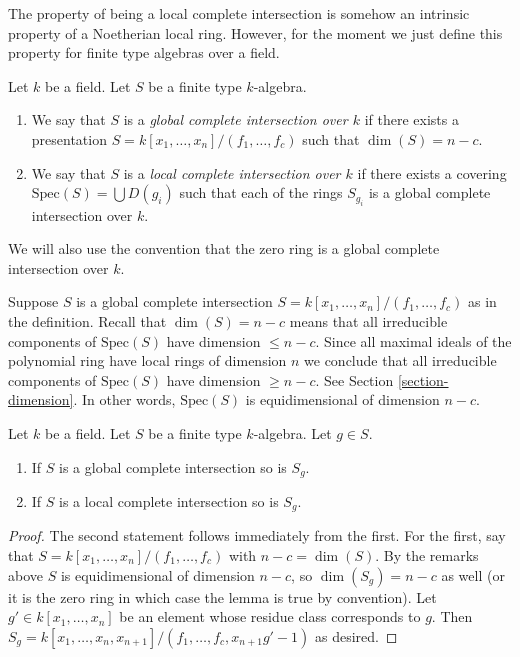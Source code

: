 \noindent
The property of being a local complete intersection is
somehow an intrinsic property of a Noetherian local ring.
However, for the moment we just define this property for
finite type algebras over a field.

\begin{definition}
\label{definition-lci-field}
Let $k$ be a field.
Let $S$ be a finite type $k$-algebra.
\begin{enumerate}
\item We say that $S$ is a {\it global complete intersection over $k$}
if there exists a presentation $S = k[x_1, \ldots, x_n]/(f_1, \ldots, f_c)$
such that $\dim(S) = n - c$.
\item We say that $S$ is a {\it local complete intersection over $k$}
if there exists a covering $\text{Spec}(S) = \bigcup D(g_i)$ such
that each of the rings $S_{g_i}$ is a global complete intersection
over $k$.
\end{enumerate}
We will also use the convention that the zero ring is a global
complete intersection over $k$.
\end{definition}

\noindent
Suppose $S$ is a global complete intersection
$S = k[x_1, \ldots, x_n]/(f_1, \ldots, f_c)$
as in the definition.
Recall that $\dim(S) = n - c$ means that all irreducible
components of $\text{Spec}(S)$ have dimension $\leq n - c$.
Since all maximal ideals of the polynomial ring have local
rings of dimension $n$ we conclude that all irreducible
components of $\text{Spec}(S)$ have dimension $\geq n - c$.
See Section \ref{section-dimension}.
In other words, $\text{Spec}(S)$ is equidimensional
of dimension $n - c$.

\begin{lemma}
\label{lemma-localize-lci}
Let $k$ be a field.
Let $S$ be a finite type $k$-algebra.
Let $g \in S$.
\begin{enumerate}
\item If $S$ is a global complete intersection so is $S_g$.
\item If $S$ is a local complete intersection so is $S_g$.
\end{enumerate}
\end{lemma}

\begin{proof}
The second statement follows immediately from the first.
For the first, say that $S = k[x_1, \ldots, x_n]/(f_1, \ldots, f_c)$
with $n - c = \dim(S)$. By the remarks above $S$ is equidimensional
of dimension $n - c$, so $\dim(S_g) = n - c$ as well (or it is
the zero ring in which case the lemma is true by convention).
Let $g' \in k[x_1, \ldots, x_n]$
be an element whose residue class corresponds to $g$.
Then
$S_g =  k[x_1, \ldots, x_n, x_{n + 1}]/(f_1, \ldots, f_c, x_{n + 1}g' - 1)$
as desired.
\end{proof}

